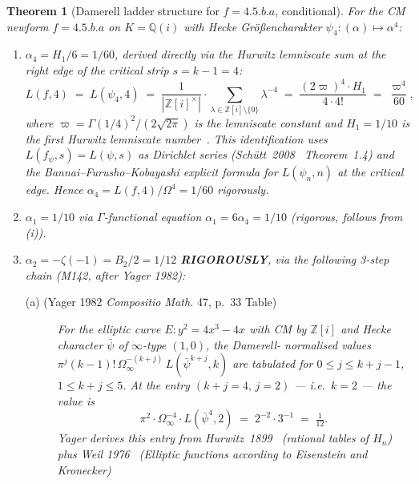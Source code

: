 \documentclass[10pt]{article}
\newtheorem{theorem}{Theorem}[section]
\theoremstyle{definition}
\newcommand{\Q}{\mathbb{Q}}
\newcommand{\Z}{\mathbb{Z}}
\begin{document}
\begin{theorem}[Damerell ladder structure for $f = 4.5.b.a$, conditional]
\label{thm:hurwitz-bernoulli}
For the CM newform $f = 4.5.b.a$ on $K = \Q(i)$ with Hecke
Gr\"o\ss encharakter $\psi_4 : (\alpha) \mapsto \alpha^4$:
\begin{enumerate}[label=\rm(\roman*)]
  \item $\alpha_4 = H_1 / 6 = 1/60$, derived directly via the Hurwitz lemniscate
        sum at the right edge of the critical strip $s = k - 1 = 4$:
        \[
          L(f, 4) \;=\; L(\psi_4, 4)
          \;=\; \frac{1}{|\Z[i]^\times|} \cdot \!\!\sum_{\lambda \in \Z[i] \setminus \{0\}}\!\! \lambda^{-4}
          \;=\; \frac{(2\varpi)^4 \cdot H_1}{4 \cdot 4!}
          \;=\; \frac{\varpi^4}{60},
        \]
        where $\varpi = \Gamma(1/4)^2/(2\sqrt{2\pi})$ is the lemniscate constant
        and $H_1 = 1/10$ is the first Hurwitz lemniscate
        number~\cite{Hurwitz1899}.  This identification uses
        $L(f_\psi, s) = L(\psi, s)$ as Dirichlet series
        (Sch\"{u}tt~2008~\cite{Schutt2008} Theorem~1.4) and the
        Bannai--Furusho--Kobayashi explicit formula
        \cite[Prop.~1.6]{BFK15} for $L(\psi_n, n)$ at the critical edge.
        Hence $\alpha_4 = L(f,4) / \Omega^4 = 1/60$ rigorously.
  \item $\alpha_1 = 1/10$ via $\Gamma$-functional equation
        $\alpha_1 = 6 \alpha_4 = 1/10$ (rigorous, follows from (i)).
  \item $\alpha_2 = -\zeta(-1) = B_2/2 = 1/12$ \textbf{RIGOROUSLY},
        via the following 3-step chain (M142, after Yager 1982):
        \begin{description}
          \item[\rm(a) (Yager 1982 \emph{Compositio Math.} 47, p.~33 Table)]
            For the elliptic curve $E: y^2 = 4x^3 - 4x$ with CM by $\Z[i]$ and
            Hecke character $\bar\psi$ of $\infty$-type $(1, 0)$, the Damerell-
            normalised values
            $\pi^j (k-1)! \, \Omega_\infty^{-(k+j)} \, L(\bar\psi^{k+j}, k)$
            are tabulated for $0 \leq j \leq k+j-1$, $1 \leq k+j \leq 5$.  At
            the entry $(k+j = 4,\, j = 2)$ — i.e.\ $k = 2$ — the value is
            \[
              \pi^2 \cdot \Omega_\infty^{-4} \cdot L(\bar\psi^4, 2)
              \;=\; 2^{-2} \cdot 3^{-1} \;=\; \tfrac{1}{12}.
            \]
            Yager derives this entry from Hurwitz~1899~\cite{Hurwitz1899}
            (rational tables of $H_n$) plus Weil 1976~\cite{Weil1976}
            (\emph{Elliptic functions according to Eisenstein and Kronecker})

\end{description}
\end{enumerate}
\end{theorem}
\end{document}
